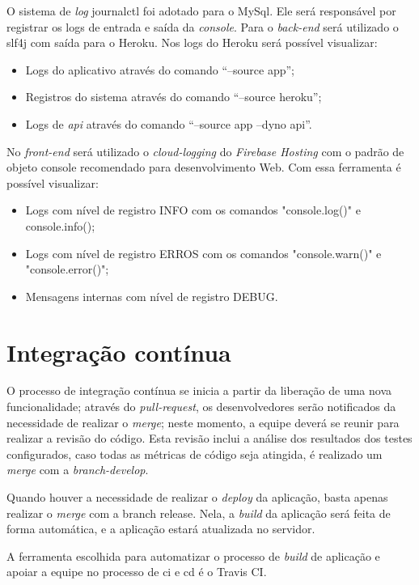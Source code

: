 O sistema de \textit{\gls{log}} \gls{journalctl} foi adotado para o MySql. Ele será responsável por registrar os logs de entrada e saída da \textit{console}. 
Para o \textit{back-end} será utilizado o \ac{slf4j} com saída para o Heroku.  Nos logs do Heroku será possível visualizar: 
\begin{itemize}
\item Logs do aplicativo através do comando “--source app”;
\item Registros do sistema através do comando “--source heroku”;
\item Logs de \textit{\ac{api}} através do comando “--source app --dyno api”.
\end{itemize}


No \textit{front-end} será utilizado o \textit{\gls{cloud-logging}} do \textit{Firebase Hosting} com o padrão de objeto console recomendado para desenvolvimento Web. Com essa ferramenta é possível visualizar:
\begin{itemize}
\item Logs com nível de registro INFO com os comandos "console.log()" e console.info();
\item Logs com nível de registro ERROS com os comandos "console.warn()" e "console.error()";
\item Mensagens internas com nível de registro DEBUG.
\end{itemize}
\section{Integração contínua}
O processo de integração contínua se inicia a partir da liberação de uma nova funcionalidade; através do \textit{\gls{pull-request}}, os desenvolvedores serão notificados da necessidade de realizar o \textit{\gls{merge}}; neste momento, a equipe deverá se reunir para realizar a revisão do código. Esta revisão inclui a análise dos resultados dos testes configurados, caso todas as métricas de código seja atingida, é realizado um \textit{\gls{merge}} com a \textit{\gls{branch-develop}}. 


Quando houver a necessidade de realizar o \textit{\gls{deploy}} da aplicação, basta apenas realizar o \textit{merge} com a branch release. Nela, a \textit{\gls{build}} da aplicação será feita de forma automática, e a aplicação estará atualizada no servidor. 


A ferramenta escolhida para automatizar o processo de \textit{\gls{build}} de aplicação e  apoiar a equipe no processo de \ac{ci} e \ac{cd} é o Travis CI.


